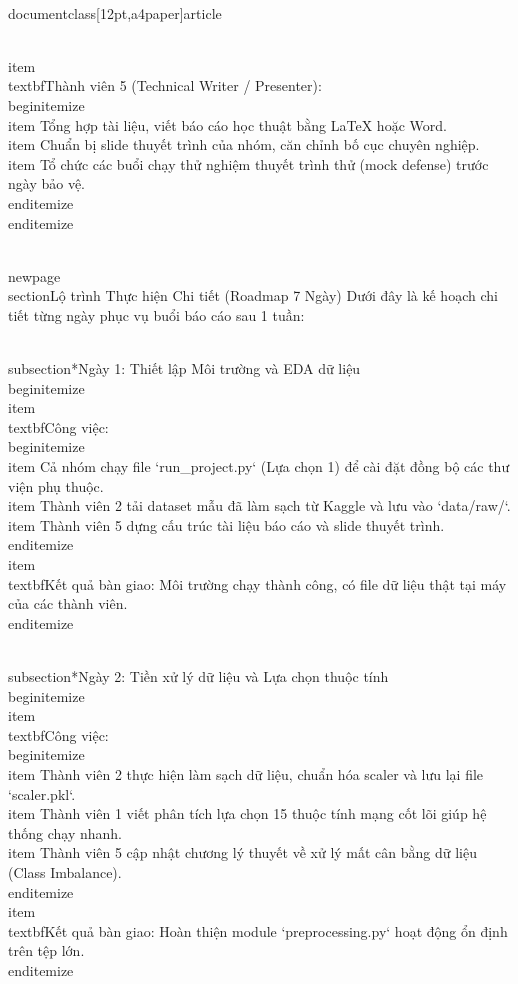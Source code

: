 \\documentclass[12pt,a4paper]{article}
\begin{document}
    \\item \\textbf{Thành viên 5 (Technical Writer / Presenter):}
    \\begin{itemize}
        \\item Tổng hợp tài liệu, viết báo cáo học thuật bằng LaTeX hoặc Word.
        \\item Chuẩn bị slide thuyết trình của nhóm, căn chỉnh bố cục chuyên nghiệp.
        \\item Tổ chức các buổi chạy thử nghiệm thuyết trình thử (mock defense) trước ngày bảo vệ.
    \\end{itemize}
\\end{itemize}

\\newpage
\\section{Lộ trình Thực hiện Chi tiết (Roadmap 7 Ngày)}
Dưới đây là kế hoạch chi tiết từng ngày phục vụ buổi báo cáo sau 1 tuần:

\\subsection*{Ngày 1: Thiết lập Môi trường và EDA dữ liệu}
\\begin{itemize}
    \\item \\textbf{Công việc:} 
    \\begin{itemize}
        \\item Cả nhóm chạy file `run_project.py` (Lựa chọn 1) để cài đặt đồng bộ các thư viện phụ thuộc.
        \\item Thành viên 2 tải dataset mẫu đã làm sạch từ Kaggle và lưu vào `data/raw/`.
        \\item Thành viên 5 dựng cấu trúc tài liệu báo cáo và slide thuyết trình.
    \\end{itemize}
    \\item \\textbf{Kết quả bàn giao:} Môi trường chạy thành công, có file dữ liệu thật tại máy của các thành viên.
\\end{itemize}

\\subsection*{Ngày 2: Tiền xử lý dữ liệu và Lựa chọn thuộc tính}
\\begin{itemize}
    \\item \\textbf{Công việc:}
    \\begin{itemize}
        \\item Thành viên 2 thực hiện làm sạch dữ liệu, chuẩn hóa scaler và lưu lại file `scaler.pkl`.
        \\item Thành viên 1 viết phân tích lựa chọn 15 thuộc tính mạng cốt lõi giúp hệ thống chạy nhanh.
        \\item Thành viên 5 cập nhật chương lý thuyết về xử lý mất cân bằng dữ liệu (Class Imbalance).
    \\end{itemize}
    \\item \\textbf{Kết quả bàn giao:} Hoàn thiện module `preprocessing.py` hoạt động ổn định trên tệp lớn.
\\end{itemize}
\end{document}

